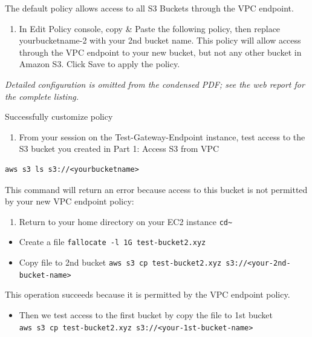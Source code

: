 The default policy allows access to all S3 Buckets through the VPC
endpoint.

\begin{enumerate}
\def\labelenumi{\arabic{enumi}.}
\setcounter{enumi}{3}
\tightlist
\item
  In Edit Policy console, copy \& Paste the following policy, then
  replace yourbucketname-2 with your 2nd bucket name. This policy will
  allow access through the VPC endpoint to your new bucket, but not any
  other bucket in Amazon S3. Click Save to apply the policy.
\end{enumerate}

\emph{Detailed configuration is omitted from the condensed PDF; see the
web report for the complete listing.}

Successfully customize policy

\begin{enumerate}
\def\labelenumi{\arabic{enumi}.}
\setcounter{enumi}{4}
\tightlist
\item
  From your session on the Test-Gateway-Endpoint instance, test access
  to the S3 bucket you created in Part 1: Access S3 from VPC
\end{enumerate}

\begin{verbatim}
aws s3 ls s3://<yourbucketname>
\end{verbatim}

This command will return an error because access to this bucket is not
permitted by your new VPC endpoint policy:

\begin{enumerate}
\def\labelenumi{\arabic{enumi}.}
\setcounter{enumi}{5}
\tightlist
\item
  Return to your home directory on your EC2 instance
  \texttt{cd\textasciitilde{}}
\end{enumerate}

\begin{itemize}
\tightlist
\item
  Create a file \texttt{fallocate\ -l\ 1G\ test-\allowbreak{}bucket2.\allowbreak{}xyz}
\item
  Copy file to 2nd bucket
  \texttt{aws\ s3\ cp\ test-bucket2.xyz\ s3://\textless{}your-2nd-bucket-name\textgreater{}}
\end{itemize}

This operation succeeds because it is permitted by the VPC endpoint
policy.

\begin{itemize}
\tightlist
\item
  Then we test access to the first bucket by copy the file to 1st bucket
  \texttt{aws\ s3\ cp\ test-bucket2.xyz\ s3://\textless{}your-1st-bucket-name\textgreater{}}
\end{itemize}

